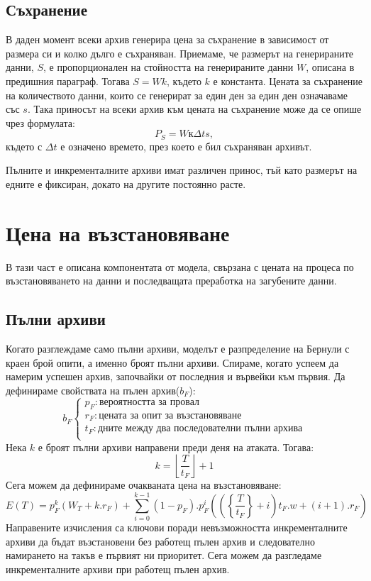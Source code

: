 \documentclass[11pt, a4paper]{article}
\theoremstyle{definition}
\begin{document}
	\subsection{Съхранение}
		В даден момент всеки архив генерира цена за съхранение в зависимост от размера си и колко дълго е съхраняван. Приемаме, че размерът на генерираните данни, $S$, е пропорционален на стойността на генерираните данни $W$, описана в предишния параграф. Тогава $S=Wk$, където $k$ е константа. Цената за съхранение на количеството данни, които се генерират за един ден за един ден означаваме със $s$. Така приносът на всеки архив към цената на съхранение може да се опише чрез формулата:
		$$
			P_S = Wк\Delta ts,
		$$
		където с $\Delta t$ е означено времето, през което е бил съхраняван архивът.\par\noindent
		Пълните и инкременталните архиви имат различен принос, тъй като размерът на едните е фиксиран, докато на другите постоянно расте.
\section{Цена на възстановяване}\label{Recovery_price}
	В тази част е описана компонентата от модела, свързана с цената на процеса по възстановяването на данни и последващата преработка на загубените данни.
	\subsection{Пълни архиви}
				Когато разглеждаме само пълни архиви, моделът е разпределение на Бернули с краен брой опити, а именно броят пълни архиви. Спираме, когато успеем да намерим успешен архив, започвайки от последния и вървейки към първия. Да дефинираме свойствата на пълен архив($b_F$):
				$$
				b_F
				\begin{cases}
				p_F: \text{вероятността за провал}\\
				r_F: \text{цената за опит за възстановяване}\\
				t_F: \text{дните между два последователни пълни архива}\\
				\end{cases}
				$$
				Нека $k$ е броят пълни архиви направени преди деня на атаката. Тогава:
				$$
				k = \left \lfloor{\frac{T}{t_F}}\right \rfloor + 1
				$$
				Сега можем да дефинираме очакваната цена на възстановяване:
				\begin{equation}
					\label{eq:1}
					E(T) = p_F^{k}\left(W_T + k.r_F\right) + \displaystyle \sum_{i=0}^{k-1} 	(1-p_F).p_F^{i}\left( \left (\left\{ \frac{T}{t_F}\right \} + i\right)t_F.w + (i+1).r_F \right )
				\end{equation}
				Направените изчисления са ключови поради невъзможността инкременталните архиви да бъдат възстановени без работещ пълен архив и следователно намирането на такъв е първият ни приоритет. Сега можем да разгледаме инкременталните архиви при работещ пълен архив.
\newpage
\end{document}

